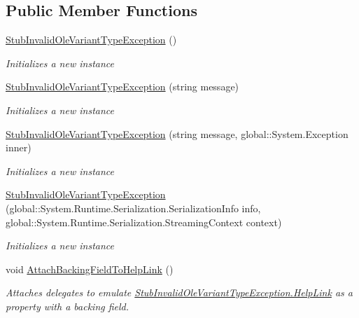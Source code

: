 \subsection*{Public Member Functions}
\begin{DoxyCompactItemize}
\item 
\hyperlink{class_system_1_1_runtime_1_1_interop_services_1_1_fakes_1_1_stub_invalid_ole_variant_type_exception_ab1f50c8f10af4cacab5519eac98cacf6}{Stub\-Invalid\-Ole\-Variant\-Type\-Exception} ()
\begin{DoxyCompactList}\small\item\em Initializes a new instance\end{DoxyCompactList}\item 
\hyperlink{class_system_1_1_runtime_1_1_interop_services_1_1_fakes_1_1_stub_invalid_ole_variant_type_exception_a08ab41781dc686311442fc87fd3950ae}{Stub\-Invalid\-Ole\-Variant\-Type\-Exception} (string message)
\begin{DoxyCompactList}\small\item\em Initializes a new instance\end{DoxyCompactList}\item 
\hyperlink{class_system_1_1_runtime_1_1_interop_services_1_1_fakes_1_1_stub_invalid_ole_variant_type_exception_a5e79c96327ddf4f62d7e08868a08e895}{Stub\-Invalid\-Ole\-Variant\-Type\-Exception} (string message, global\-::\-System.\-Exception inner)
\begin{DoxyCompactList}\small\item\em Initializes a new instance\end{DoxyCompactList}\item 
\hyperlink{class_system_1_1_runtime_1_1_interop_services_1_1_fakes_1_1_stub_invalid_ole_variant_type_exception_a7fd6fbb503ce55b320989be2d65600f0}{Stub\-Invalid\-Ole\-Variant\-Type\-Exception} (global\-::\-System.\-Runtime.\-Serialization.\-Serialization\-Info info, global\-::\-System.\-Runtime.\-Serialization.\-Streaming\-Context context)
\begin{DoxyCompactList}\small\item\em Initializes a new instance\end{DoxyCompactList}\item 
void \hyperlink{class_system_1_1_runtime_1_1_interop_services_1_1_fakes_1_1_stub_invalid_ole_variant_type_exception_aa58caa497f3b5c3610aeefc364cdaa38}{Attach\-Backing\-Field\-To\-Help\-Link} ()
\begin{DoxyCompactList}\small\item\em Attaches delegates to emulate \hyperlink{class_system_1_1_runtime_1_1_interop_services_1_1_fakes_1_1_stub_invalid_ole_variant_type_exception_a69b9512ec5625ab345c28ee2eac6cfad}{Stub\-Invalid\-Ole\-Variant\-Type\-Exception.\-Help\-Link} as a property with a backing field.\end{DoxyCompactList}\item 

\end{DoxyCompactItemize}
